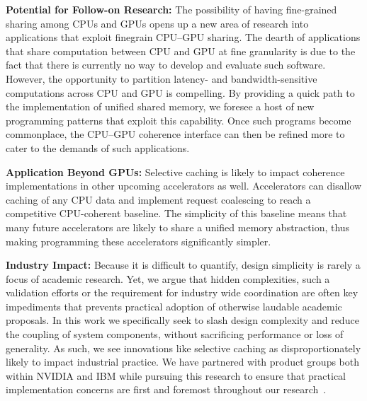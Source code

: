 \textbf{Potential for Follow-on Research:} The possibility of having
fine-grained sharing among CPUs and GPUs opens up a new area of research into
applications that exploit finegrain CPU--GPU sharing. The dearth of
applications that share computation between CPU and GPU at fine granularity is
due to the fact that there is currently no way to develop and evaluate such
software. However, the opportunity to partition latency- and bandwidth-sensitive
computations across CPU and GPU is compelling. By providing a quick path to the
implementation of unified shared memory, we foresee a host of new programming
patterns that exploit this capability. Once such programs become commonplace,
the CPU--GPU coherence interface can then be refined more to cater to the demands
of such applications.

\textbf{Application Beyond GPUs:} Selective caching is likely to impact
coherence implementations in other upcoming accelerators as well. Accelerators
can disallow caching of any CPU data and implement request coalescing to reach a
competitive CPU-coherent baseline. The simplicity of this baseline means that
many future accelerators are likely to share a unified memory abstraction,
thus making programming these accelerators significantly simpler.

\textbf{Industry Impact:} Because it is difficult to quantify, design simplicity
is rarely a focus of academic research. Yet, we argue that hidden complexities,
such a validation efforts or the requirement for industry wide coordination are
often key impediments that prevents practical adoption of otherwise laudable
academic proposals. In this work we specifically seek to slash design complexity
and reduce the coupling of system components, without sacrificing performance or
loss of generality. As such, we see innovations like selective caching as
disproportionately likely to impact industrial practice. We have partnered with
product groups both within NVIDIA and IBM while pursuing this research to ensure
that practical implementation concerns are first and foremost throughout our
research~\cite{coral2014}.
